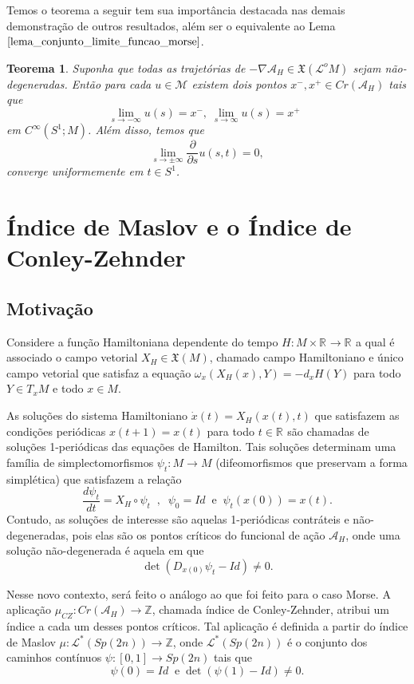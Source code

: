 \documentclass[12pt]{book}
\newtheorem{teorema}{Teorema}[section]
\newcommand{\caminhosespeciais}[1]{\mathcal{L}^{*}(#1)}
\newcommand{\campohamiltoniano}[1]{X_{H}(#1)}
\newcommand{\campohamiltonianoabrev}{X_{H}}
\newcommand{\campossuaves}[1]{\mathfrak{X}(#1)}
\newcommand{\circulo}{S^{1}}
\newcommand{\derivada}[2]{\frac{d #1}{d #2}}
\newcommand{\derivadaparcial}[2]{\frac{\partial #1}{\partial #2}}
\newcommand{\energiafinitaM}{\mathcal{M}}
\newcommand{\espacotangenteponto}[2]{T_{#1}#2}
\newcommand{\funcionalH}{\mathcal{A}_{H}}
\newcommand{\gradientefuncional}{\nabla \funcionalH}
\newcommand{\gruposimpletico}[1]{Sp(#1)}
\newcommand{\iconleyabrev}{\mu_{CZ}}
\newcommand{\inteiros}{\mathbb{Z}}
\newcommand{\intervalo}{[0,1]}
\newcommand{\pontoscriticos}[1]{\textit{Cr}(#1)}
\newcommand{\real}[1]{\mathbb{R}^{#1}}
\newcommand{\reta}{\real{}}
\newcommand{\lacocontrateis}{\mathcal{L}^{o}M}
\begin{document}
	Temos o teorema a seguir tem sua importância destacada nas demais demonstração de outros resultados, além ser o equivalente ao Lema $\ref{lema_conjunto_limite_funcao_morse}$.
	
	\begin{teorema}\label{teorema_limite_solucoes_energia_finita}
		Suponha que todas as trajetórias de $-\gradientefuncional \in \campossuaves{\lacocontrateis}$ sejam não-degeneradas. Então para cada $u \in \energiafinitaM$ existem dois pontos $x^{-}, x^{+}\in \pontoscriticos{\funcionalH}$ tais que
		$$
		\lim_{s\to -\infty}u(s)=x^{-},\; \lim_{s\to \infty}u(s)=x^{+}\;\;
		$$
		em $C^{\infty}(\circulo;M)$. Além disso, temos que
		$$
		\lim_{s\to \pm \infty}\derivadaparcial{}{s}u(s,t) = 0,
		$$
		converge uniformemente em $t\in \circulo$.
	\end{teorema}
	
	\chapter{Índice de Maslov e o Índice de Conley-Zehnder}
	\section{Motivação}
	Considere a função Hamiltoniana dependente do tempo $H:M\times \reta\to \reta$ a qual é associado o campo vetorial $X_{H} \in \campossuaves{M}$, chamado campo Hamiltoniano e único campo vetorial que satisfaz a equação $\omega_{x}(\campohamiltoniano{x}, Y) = -d_{x}H(Y)$ para todo $Y \in \espacotangenteponto{x}{M}$ e todo $x \in M$. 
	
	As soluções do sistema Hamiltoniano $\dot{x}(t) = X_{H}(x(t), t)$ que satisfazem as condições periódicas $x(t+1) = x(t)$ para todo $t\in \reta$ são chamadas de soluções 1-periódicas das equações de Hamilton. Tais soluções determinam uma família de simplectomorfismos $\psi_{t}:M \to M$ (difeomorfismos que preservam a forma simplética) que satisfazem a relação 
	$$
	\derivada{\psi_{t}}{t}=\campohamiltonianoabrev\circ\psi_{t} \;\;, \;\; \psi_{0}=Id \;\;\text{e}\;\;  \psi_{t}(x(0)) = x(t).
	$$
	Contudo, as soluções de interesse são aquelas 1-periódicas contráteis e não-degeneradas, pois elas são os pontos críticos do funcional de ação $\funcionalH$, onde uma solução não-degenerada é aquela em que 
	$$
	\det(D_{x(0)}\psi_{t} -Id)\neq 0.
	$$
	
	
	Nesse novo contexto, será feito o análogo ao que foi feito para o caso Morse. A aplicação $\iconleyabrev:\pontoscriticos{\funcionalH} \to \inteiros$, chamada índice de Conley-Zehnder, atribui um índice a cada um desses pontos críticos. Tal aplicação é definida a partir do índice de Maslov $\mu:\caminhosespeciais{\gruposimpletico{2n}} \to \inteiros$, onde $\caminhosespeciais{\gruposimpletico{2n}}$ é o conjunto dos caminhos contínuos $\psi:\intervalo \to \gruposimpletico{2n}$ tais que 
	$$
	\psi(0)=Id\;\;\text{e}\;\det(\psi(1)-Id)\neq 0.
	$$
	
\end{document}
